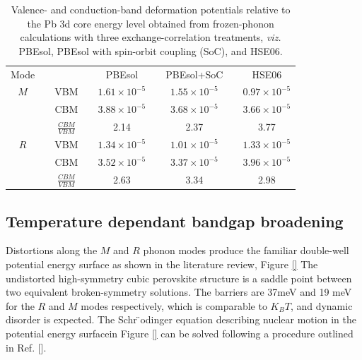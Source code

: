 \begin{table}[]
\caption[Valence- and conduction-band deformation potentials]{
Valence- and conduction-band deformation potentials relative to the Pb 3d core energy level obtained from frozen-phonon calculations with three exchange-correlation treatments, \textit{viz.} PBEsol, PBEsol with spin-orbit coupling (SoC), and HSE06.
}
\begin{tabular}{ccccccccc} \label{ch5allxc}
Mode & \hspace{5pt} & & \hspace{5pt} & PBEsol & \hspace{5pt} & PBEsol+SoC & \hspace{5pt} & HSE06 \\
$M$ & & VBM & & $1.61 \times 10^{-5}$ & & $1.55 \times 10^{-5}$ & & $0.97 \times 10^{-5}$ \\
& & CBM & & $3.88 \times 10^{-5}$ & & $3.68 \times 10^{-5}$ & & $3.66 \times 10^{-5}$ \\ 
& & $\frac{CBM}{VBM}$ & & 2.14 &  & 2.37 & & 3.77  \vspace{5pt} \\

$R$ & & VBM & & $1.34 \times 10^{-5}$ & & $1.01 \times 10^{-5}$ & & $1.33 \times 10^{-5}$ \\
& & CBM & & $3.52 \times 10^{-5}$ & & $3.37 \times 10^{-5}$ & & $3.96 \times 10^{-5}$ \\
& & $\frac{CBM}{VBM}$ & & 2.63 & & 3.34 & & 2.98 \vspace{5pt} \\ 
\end{tabular}
\end{table}


\subsection{Temperature dependant bandgap broadening} \label{ch5coupling}

Distortions along the $M$ and $R$ phonon modes produce the familiar double-well potential energy surface as shown in the literature review, Figure \ref{}
The undistorted high-symmetry cubic perovskite structure is a saddle point between two equivalent broken-symmetry solutions. The barriers are 37meV and 19 meV for the $R$ and $M$ modes respectively, which is comparable to $K_BT$, and dynamic disorder is expected.
The Schr ̈odinger equation describing nuclear motion in the potential energy surfacein  Figure \ref{} can be solved following a procedure outlined in Ref. [].\cite{}%

